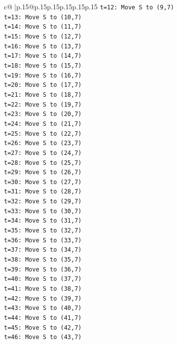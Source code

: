 \documentclass{article}
\begin{document}
{\begin{supertabular}{c@{$\;$}|p{.15\linewidth}@{}p{.15\linewidth}p{.15\linewidth}p{.15\linewidth}p{.15\linewidth}p{.15\linewidth}}
{{{\texttt{t=12: Move S to (9,7)} \\
\texttt{t=13: Move S to (10,7)} \\
\texttt{t=14: Move S to (11,7)} \\
\texttt{t=15: Move S to (12,7)} \\
\texttt{t=16: Move S to (13,7)} \\
\texttt{t=17: Move S to (14,7)} \\
\texttt{t=18: Move S to (15,7)} \\
\texttt{t=19: Move S to (16,7)} \\
\texttt{t=20: Move S to (17,7)} \\
\texttt{t=21: Move S to (18,7)} \\
\texttt{t=22: Move S to (19,7)} \\
\texttt{t=23: Move S to (20,7)} \\
\texttt{t=24: Move S to (21,7)} \\
\texttt{t=25: Move S to (22,7)} \\
\texttt{t=26: Move S to (23,7)} \\
\texttt{t=27: Move S to (24,7)} \\
\texttt{t=28: Move S to (25,7)} \\
\texttt{t=29: Move S to (26,7)} \\
\texttt{t=30: Move S to (27,7)} \\
\texttt{t=31: Move S to (28,7)} \\
\texttt{t=32: Move S to (29,7)} \\
\texttt{t=33: Move S to (30,7)} \\
\texttt{t=34: Move S to (31,7)} \\
\texttt{t=35: Move S to (32,7)} \\
\texttt{t=36: Move S to (33,7)} \\
\texttt{t=37: Move S to (34,7)} \\
\texttt{t=38: Move S to (35,7)} \\
\texttt{t=39: Move S to (36,7)} \\
\texttt{t=40: Move S to (37,7)} \\
\texttt{t=41: Move S to (38,7)} \\
\texttt{t=42: Move S to (39,7)} \\
\texttt{t=43: Move S to (40,7)} \\
\texttt{t=44: Move S to (41,7)} \\
\texttt{t=45: Move S to (42,7)} \\
\texttt{t=46: Move S to (43,7)} \\
}}}
\end{supertabular}}
\end{document}
